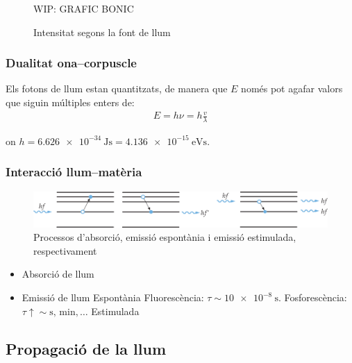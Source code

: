 \begin{figure}[H]
\centering
    WIP: GRAFIC BONIC 
\caption{Intensitat segons la font de llum}
\end{figure}

\subsubsection*{Dualitat ona--corpuscle}
Els fotons de llum estan quantitzats, de manera que $E$ només pot agafar valors que siguin múltiples enters de:
\begin{align}
    \boxed{E = h \nu = h \frac{v}{\lambda}}
\end{align}

on $h = \SI{6.626 e-34}{\J\s} = \SI{4.136 e-15}{\eV\s}$.

\subsubsection*{Interacció llum--matèria}
\begin{figure}[H]
\centering
    \includegraphics[width=\textwidth]{images/3/31-interaccio.png}
\caption{Processos d'absorció, emissió espontània i emissió estimulada, respectivament}
\end{figure}
\begin{itemize}
    \item Absorció de llum
    \item Emissió de llum
        \subitem Espontània
            \subsubitem Fluorescència: $\tau \sim \SI{10 e-8}{\s}$.
            \subsubitem Fosforescència: $\tau \uparrow \sim \si{\s}, \, \si{\minute}, \dots$
        \subitem Estimulada
\end{itemize}
\subsection{Propagació de la llum}
